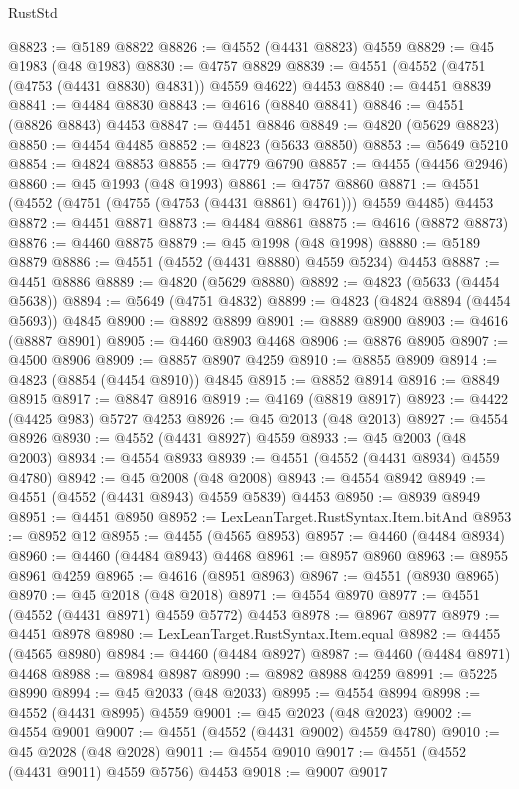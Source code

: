 \begin{lexlean}{RustStd}
\begin{coremodule}
@8823 := @5189 @8822
@8826 := @4552 (@4431 @8823) @4559
@8829 := @45 @1983 (@48 @1983)
@8830 := @4757 @8829
@8839 := @4551 (@4552 (@4751 (@4753 (@4431 @8830) @4831)) @4559 @4622) @4453
@8840 := @4451 @8839
@8841 := @4484 @8830
@8843 := @4616 (@8840 @8841)
@8846 := @4551 (@8826 @8843) @4453
@8847 := @4451 @8846
@8849 := @4820 (@5629 @8823)
@8850 := @4454 @4485
@8852 := @4823 (@5633 @8850)
@8853 := @5649 @5210
@8854 := @4824 @8853
@8855 := @4779 @6790
@8857 := @4455 (@4456 @2946)
@8860 := @45 @1993 (@48 @1993)
@8861 := @4757 @8860
@8871 := @4551 (@4552 (@4751 (@4755 (@4753 (@4431 @8861) @4761))) @4559 @4485) @4453
@8872 := @4451 @8871
@8873 := @4484 @8861
@8875 := @4616 (@8872 @8873)
@8876 := @4460 @8875
@8879 := @45 @1998 (@48 @1998)
@8880 := @5189 @8879
@8886 := @4551 (@4552 (@4431 @8880) @4559 @5234) @4453
@8887 := @4451 @8886
@8889 := @4820 (@5629 @8880)
@8892 := @4823 (@5633 (@4454 @5638))
@8894 := @5649 (@4751 @4832)
@8899 := @4823 (@4824 @8894 (@4454 @5693)) @4845
@8900 := @8892 @8899
@8901 := @8889 @8900
@8903 := @4616 (@8887 @8901)
@8905 := @4460 @8903 @4468
@8906 := @8876 @8905
@8907 := @4500 @8906
@8909 := @8857 @8907 @4259
@8910 := @8855 @8909
@8914 := @4823 (@8854 (@4454 @8910)) @4845
@8915 := @8852 @8914
@8916 := @8849 @8915
@8917 := @8847 @8916
@8919 := @4169 (@8819 @8917)
@8923 := @4422 (@4425 @983) @5727 @4253
@8926 := @45 @2013 (@48 @2013)
@8927 := @4554 @8926
@8930 := @4552 (@4431 @8927) @4559
@8933 := @45 @2003 (@48 @2003)
@8934 := @4554 @8933
@8939 := @4551 (@4552 (@4431 @8934) @4559 @4780)
@8942 := @45 @2008 (@48 @2008)
@8943 := @4554 @8942
@8949 := @4551 (@4552 (@4431 @8943) @4559 @5839) @4453
@8950 := @8939 @8949
@8951 := @4451 @8950
@8952 := LexLeanTarget.RustSyntax.Item.bitAnd
@8953 := @8952 @12
@8955 := @4455 (@4565 @8953)
@8957 := @4460 (@4484 @8934)
@8960 := @4460 (@4484 @8943) @4468
@8961 := @8957 @8960
@8963 := @8955 @8961 @4259
@8965 := @4616 (@8951 @8963)
@8967 := @4551 (@8930 @8965)
@8970 := @45 @2018 (@48 @2018)
@8971 := @4554 @8970
@8977 := @4551 (@4552 (@4431 @8971) @4559 @5772) @4453
@8978 := @8967 @8977
@8979 := @4451 @8978
@8980 := LexLeanTarget.RustSyntax.Item.equal
@8982 := @4455 (@4565 @8980)
@8984 := @4460 (@4484 @8927)
@8987 := @4460 (@4484 @8971) @4468
@8988 := @8984 @8987
@8990 := @8982 @8988 @4259
@8991 := @5225 @8990
@8994 := @45 @2033 (@48 @2033)
@8995 := @4554 @8994
@8998 := @4552 (@4431 @8995) @4559
@9001 := @45 @2023 (@48 @2023)
@9002 := @4554 @9001
@9007 := @4551 (@4552 (@4431 @9002) @4559 @4780)
@9010 := @45 @2028 (@48 @2028)
@9011 := @4554 @9010
@9017 := @4551 (@4552 (@4431 @9011) @4559 @5756) @4453
@9018 := @9007 @9017

\end{coremodule}
\end{lexlean}
